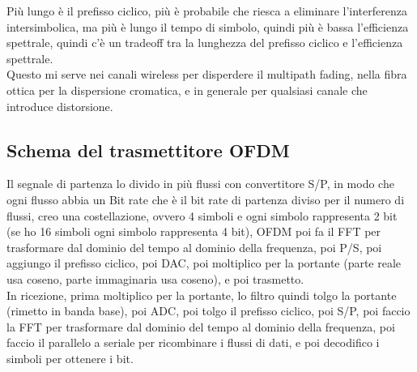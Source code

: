 Più lungo è il prefisso ciclico, più è probabile che riesca a eliminare l'interferenza intersimbolica, ma più è lungo il tempo di simbolo, quindi
più è bassa l'efficienza spettrale, quindi c'è un tradeoff tra la lunghezza del prefisso ciclico e l'efficienza spettrale. \\%

Questo mi serve nei canali wireless per disperdere il multipath fading, nella fibra ottica per la dispersione cromatica, 
e in generale per qualsiasi canale che introduce distorsione.\\

\subsection{Schema del trasmettitore OFDM}
Il segnale di partenza lo divido in più flussi con convertitore S/P, in modo che ogni flusso abbia un Bit rate che è il bit rate di partenza diviso 
per il numero di flussi, creo una costellazione, ovvero 4 simboli e ogni simbolo rappresenta 2 bit (se ho 16 simboli ogni simbolo rappresenta 4 bit), 
OFDM poi fa il FFT per trasformare dal dominio del tempo al dominio della frequenza, poi P/S, poi aggiungo il prefisso ciclico, poi DAC,  
poi moltiplico per la portante (parte reale usa coseno, parte immaginaria usa coseno), e poi trasmetto.\\

In ricezione, prima moltiplico per la portante, lo filtro quindi tolgo la portante (rimetto in banda base), poi ADC, poi tolgo il prefisso ciclico, 
poi S/P, poi faccio la FFT per trasformare dal dominio del tempo al dominio della frequenza, poi faccio il parallelo a seriale per ricombinare i flussi di dati, 
e poi decodifico i simboli per ottenere i bit.\\

